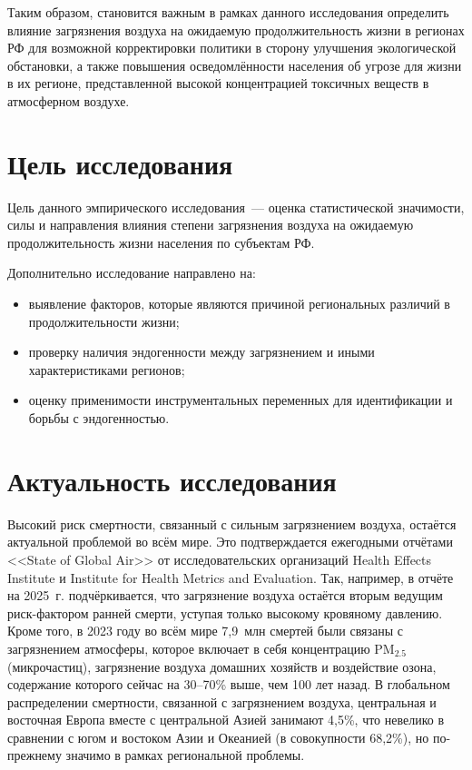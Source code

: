 \documentclass[10pt,a4paper]{article}
\begin{document}
\medskip

Таким образом, становится важным в рамках данного исследования определить влияние загрязнения воздуха на ожидаемую продолжительность жизни в регионах РФ для возможной корректировки политики в сторону улучшения экологической обстановки, а также повышения осведомлённости населения об угрозе для жизни в их регионе, представленной высокой концентрацией токсичных веществ в атмосферном воздухе.

\section*{Цель исследования}

Цель данного эмпирического исследования~--- оценка статистической значимости, силы и направления влияния степени загрязнения воздуха на ожидаемую продолжительность жизни населения по субъектам РФ.

Дополнительно исследование направлено на:
\begin{itemize}
  \item выявление факторов, которые являются причиной региональных различий в продолжительности жизни;
  \item проверку наличия эндогенности между загрязнением и иными характеристиками регионов;
  \item оценку применимости инструментальных переменных для идентификации и борьбы с эндогенностью.
\end{itemize}

\section*{Актуальность исследования}

Высокий риск смертности, связанный с сильным загрязнением воздуха, остаётся актуальной проблемой во всём мире. Это подтверждается ежегодными отчётами <<State of Global Air>> от исследовательских организаций Health Effects Institute и Institute for Health Metrics and Evaluation. Так, например, в отчёте на 2025~г. подчёркивается, что загрязнение воздуха остаётся вторым ведущим риск-фактором ранней смерти, уступая только высокому кровяному давлению. Кроме того, в 2023 году во всём мире 7{,}9~млн смертей были связаны с загрязнением атмосферы, которое включает в себя концентрацию $\text{PM}_{2.5}$ (микрочастиц), загрязнение воздуха домашних хозяйств и воздействие озона, содержание которого сейчас на 30--70\% выше, чем 100 лет назад. В глобальном распределении смертности, связанной с загрязнением воздуха, центральная и восточная Европа вместе с центральной Азией занимают 4{,}5\%, что невелико в сравнении с югом и востоком Азии и Океанией (в совокупности 68{,}2\%), но по-прежнему значимо в рамках региональной проблемы.
\end{document}
